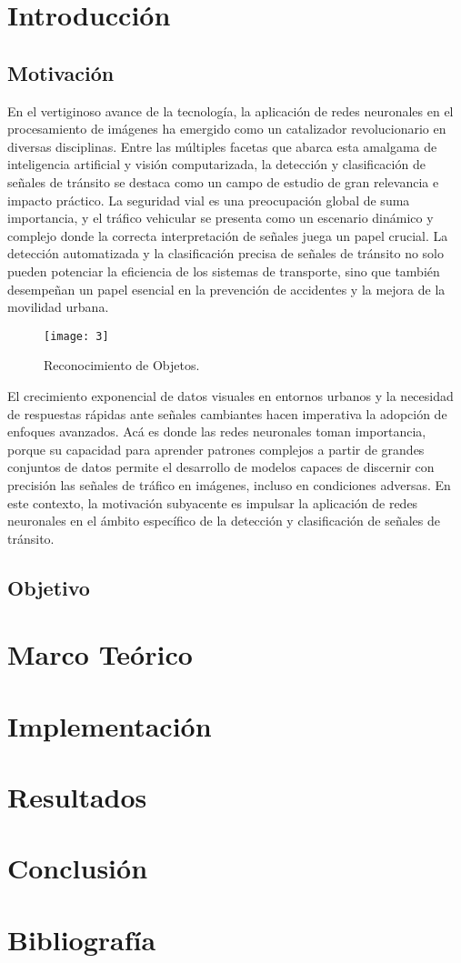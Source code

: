 \section{Introducción}
	\subsection{Motivación}
	En el vertiginoso avance de la tecnología, la aplicación de redes neuronales en el procesamiento de imágenes ha emergido como un catalizador revolucionario en diversas disciplinas. Entre las múltiples facetas que abarca esta amalgama de inteligencia artificial y visión computarizada, la detección y clasificación de señales de tránsito se destaca como un campo de estudio de gran relevancia e impacto práctico.
La seguridad vial es una preocupación global de suma importancia, y el tráfico vehicular se presenta como un escenario dinámico y complejo donde la correcta interpretación de señales juega un papel crucial. La detección automatizada y la clasificación precisa de señales de tránsito no solo pueden potenciar la eficiencia de los sistemas de transporte, sino que también desempeñan un papel esencial en la prevención de accidentes y la mejora de la movilidad urbana.
	\begin{figure}[ht]
		\centering
		\texttt{[image: 3]}
		\caption{Reconocimiento de Objetos.}
	\end{figure}
	
El crecimiento exponencial de datos visuales en entornos urbanos y la necesidad de respuestas rápidas ante señales cambiantes hacen imperativa la adopción de enfoques avanzados. Acá es donde las redes neuronales toman importancia, porque su capacidad para aprender patrones complejos a partir de grandes conjuntos de datos permite el desarrollo de modelos capaces de discernir con precisión las señales de tráfico en imágenes, incluso en condiciones adversas.
En este contexto, la motivación subyacente es impulsar la aplicación de redes neuronales en el ámbito específico de la detección y clasificación de señales de tránsito.

\subsection {Objetivo}
\newpage

\section{Marco Teórico}
\section{Implementación}
\section{Resultados}
\section{Conclusión}
\section{Bibliografía}
